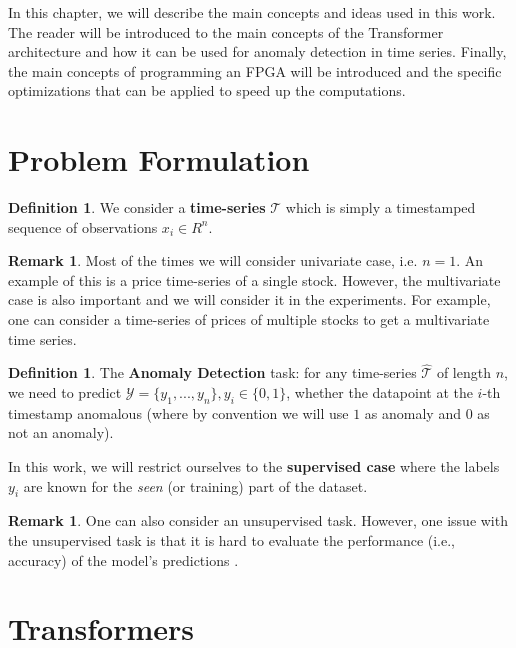 \documentclass[a4paper, twoside]{report}
\theoremstyle{definition}
\newtheorem{definition}[theorem]{Definition}
\newtheorem{remark}[theorem]{Remark}
\numberwithin{equation}{section}
\begin{document}
In this chapter, we will describe the main concepts and ideas used in this work.
The reader will be introduced to the main concepts of the Transformer architecture and how it can be used for anomaly detection in time series.
Finally, the main concepts of programming an FPGA will be introduced and the specific optimizations that can be applied to speed up the computations.


\section{Problem Formulation}


\begin{definition}
    We consider a \textbf{time-series} $\mathcal{T}$ which is simply a timestamped sequence of observations $x_i \in R^n$.
\end{definition}
\begin{remark}
    Most of the times we will consider univariate case, i.e. $n=1$.
    An example of this is a price time-series of a single stock.
    However, the multivariate case is also important and we will consider it in the experiments.
    For example, one can consider a time-series of prices of multiple stocks to get a multivariate time series.
\end{remark}


\begin{definition}
    The \textbf{Anomaly Detection} task:
    for any time-series $\hat{\mathcal{T}}$ of length $n$, we need to predict $\mathcal{Y} = \{y_1, . . . , y_n \}, y_i \in \{0, 1\}$,
    whether the datapoint at the $i$-th timestamp anomalous (where by convention we will use $1$ as anomaly and $0$ as not an anomaly).
\end{definition}
In this work, we will restrict ourselves to the \textbf{supervised case}
where the labels $y_i$ are known for the \emph{seen} (or training) part of the dataset.

\begin{remark}
    One can also consider an unsupervised task.
    However, one issue with the unsupervised task is that it is hard to evaluate
    the performance (i.e., accuracy) of the model's predictions \cite{1905.05667}.
\end{remark}


\section{Transformers}
\end{document}
